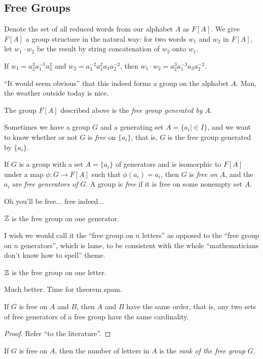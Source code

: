 \subsection{Free Groups}
Denote the set of all reduced words from our alphabet $A$ as $F[A]$. We give $F[A]$ a group structure in the natural way: for two words $w_1$ and $w_2$ in $F[A]$, let $w_1\cdot w_2$ be the result by string concatenation of $w_2$ onto $w_1$.
\begin{example}
    If $w_1=a_2^3a_1^{-5}a_3^2$ and $w_2=a_3^{-2}a_1^2a_3a_2^{-2}$, then $w_1\cdot w_2=a_2^3a_1^{-3}a_3a_2^{-2}$.
\end{example}
``It would seem obvious'' that this indeed forms a group on the alphabet $A$. Man, the weather outside today is nice.
\begin{definition}
    The group $F[A]$ described above is the \emph{free group generated by} $A$.
\end{definition}
Sometimes we have a group $G$ and a generating set $A=\{a_i \mid \in I\} $, and we want to know whether or not $G$ is \emph{free} on $\{a_i\} $, that is, $G$ is the free group generated by $\{a_i\} $. 
\begin{definition}
    If $G$ is a group with a set $A=\{a_i\} $ of generators and is isomorphic to $F[A]$ under a map $\phi \colon G \to F[A]$ such that $\phi(a_i)=a_i$, then $G$ is \emph{free on} $A$, and the $a_i$ are \emph{free generators of} $G$. A group is \emph{free} if it is free on some nonempty set $A$.
\end{definition}
Oh you'll be free... free indeed...
\begin{example}
    $\mathbb{Z}$ is the free group on one generator.
\end{example}
I wish we would call it the ``free group on $n$ letters'' as opposed to the ``free group on $n$ generators'', which is lame, to be consistent with the whole ``mathematicians don't know how to spell'' theme.
\begin{example}
   $\mathbb{Z}$ is the free group on one letter. 
\end{example}
Much better. Time for theorem spam.
\begin{theorem}
    If $G$ is free on $A$ and $B$, then $A$ and $B$ have the same order, that is, any two sets of free generators of a free group have the same cardinality.
\end{theorem}
\begin{proof}
    Refer ``to the literature''.
\end{proof}
\begin{definition}[Rank]
    If $G$ is free on $A$, then the number of letters in $A$ is the \emph{rank of the free group} $G$.
\end{definition}
